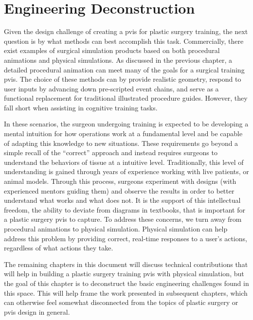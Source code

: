 
\chapter{Engineering Deconstruction}
\label{chp:engineering}

Given the design challenge of creating a \acrlong{pvis} for plastic
surgery training, the next question is by what methods can best
accomplish this task. Commercially, there exist examples of surgical
simulation products based on both procedural animations and physical
simulations. As discussed in the previous chapter, a detailed
procedural animation can meet many of the goals for a surgical
training \gls{pvis}. The choice of these methods can by provide realistic geometry,
respond to user inputs by advancing down pre-scripted event chains,
and serve as a functional replacement for traditional illustrated
procedure guides. However, they fall short when assisting in cognitive training
tasks.

In these scenarios, the surgeon undergoing training is expected to be
developing a mental intuition for how operations work at a fundamental
level and be capable of adapting this knowledge to new
situations. These requirements go beyond a simple recall of the
``correct'' approach and instead requires surgeons to understand the
behaviors of tissue at a intuitive level. Traditionally, this level of
understanding is gained through years of experience working with live
patients, or animal models. Through this process, surgeons experiment
with designs (with experienced mentors guiding them) and observe the
results in order to better understand what works and what does not. It
is the support of this intellectual freedom, the ability to deviate
from diagrams in textbooks, that is important for a plastic surgery
\gls{pvis} to capture. To address these concerns, we turn away from
procedural animations to physical simulation. Physical simulation can
help address this problem by providing correct, real-time responses to
a user's actions, regardless of what actions they take.

The remaining chapters in this document will discuss technical
contributions that will help in building a plastic surgery training
\gls{pvis} with physical simulation, but the goal of this chapter is
to deconstruct the basic engineering challenges found in this
space. This will help frame the work presented in subsequent chapters,
which can otherwise feel somewhat disconnected from the topics of
plastic surgery or \gls{pvis} design in general.

